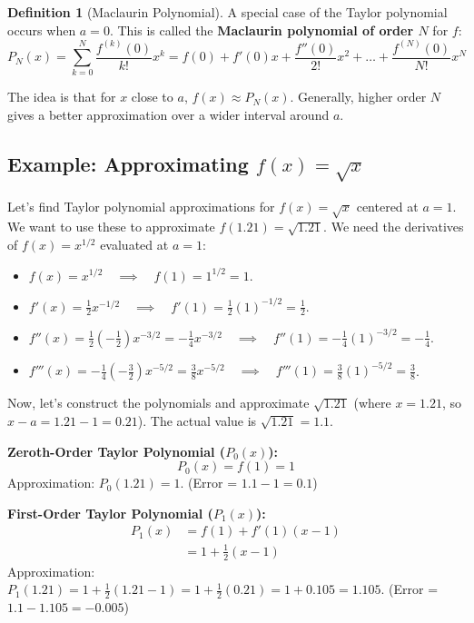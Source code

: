 \documentclass[11pt, a4paper]{article}
\theoremstyle{plain}
\theoremstyle{definition}
\newtheorem{definition}[theorem]{Definition}
\theoremstyle{remark}
\begin{document}
\begin{definition}[Maclaurin Polynomial]
A special case of the Taylor polynomial occurs when $a=0$. This is called the \textbf{Maclaurin polynomial of order $N$} for $f$:
\[ P_N(x) = \sum_{k=0}^{N} \frac{f^{(k)}(0)}{k!}x^k = f(0) + f'(0)x + \frac{f''(0)}{2!}x^2 + \dots + \frac{f^{(N)}(0)}{N!}x^N \]
\end{definition}

The idea is that for $x$ close to $a$, $f(x) \approx P_N(x)$. Generally, higher order $N$ gives a better approximation over a wider interval around $a$.

\subsection{Example: Approximating $f(x) = \sqrt{x}$}

Let's find Taylor polynomial approximations for $f(x) = \sqrt{x}$ centered at $a=1$. We want to use these to approximate $f(1.21) = \sqrt{1.21}$.
We need the derivatives of $f(x) = x^{1/2}$ evaluated at $a=1$:
\begin{itemize}
    \item $f(x) = x^{1/2} \quad \implies \quad f(1) = 1^{1/2} = 1$.
    \item $f'(x) = \frac{1}{2}x^{-1/2} \quad \implies \quad f'(1) = \frac{1}{2}(1)^{-1/2} = \frac{1}{2}$.
    \item $f''(x) = \frac{1}{2}\left(-\frac{1}{2}\right)x^{-3/2} = -\frac{1}{4}x^{-3/2} \quad \implies \quad f''(1) = -\frac{1}{4}(1)^{-3/2} = -\frac{1}{4}$.
    \item $f'''(x) = -\frac{1}{4}\left(-\frac{3}{2}\right)x^{-5/2} = \frac{3}{8}x^{-5/2} \quad \implies \quad f'''(1) = \frac{3}{8}(1)^{-5/2} = \frac{3}{8}$.
\end{itemize}
Now, let's construct the polynomials and approximate $\sqrt{1.21}$ (where $x=1.21$, so $x-a = 1.21-1 = 0.21$).
The actual value is $\sqrt{1.21} = 1.1$.

\textbf{Zeroth-Order Taylor Polynomial ($P_0(x)$):}
\[ P_0(x) = f(1) = 1 \]
Approximation: $P_0(1.21) = 1$. (Error = $1.1 - 1 = 0.1$)

\textbf{First-Order Taylor Polynomial ($P_1(x)$):}
\begin{align*} P_1(x) &= f(1) + f'(1)(x-1) \\ &= 1 + \frac{1}{2}(x-1) \end{align*}
Approximation:
$P_1(1.21) = 1 + \frac{1}{2}(1.21-1) = 1 + \frac{1}{2}(0.21) = 1 + 0.105 = 1.105$.
(Error = $1.1 - 1.105 = -0.005$)
\end{document}

